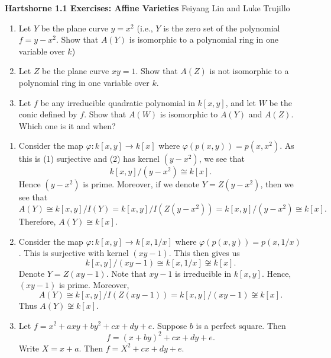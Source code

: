 \documentclass{/Users/SHER/Documents/Hartshorne-Exercises/hw_pset} %
\renewcommand{\phi}{\varphi}
\newcommand{\header}[2]{
    {\noindent
    {\Large \bf Hartshorne #1 Exercises: #2}
    \hfill 
    {\large Feiyang Lin and Luke Trujillo}
    \vspace{0.5cm}}
}
\begin{document}
\header{1.1}{Affine Varieties}
    
\begin{exercise}[1.1]
    \begin{enumerate}
        \item Let $Y$ be the plane curve $y = x^2$ (i.e., $Y$ is the zero set of 
        the polynomial $f = y - x^2$. Show that $A(Y)$ is isomorphic to a polynomial ring 
        in one variable over $k$)

        \item Let $Z$ be the plane curve $xy = 1$. Show that $A(Z)$ is not isomorphic to 
        a polynomial ring in one variable over $k$. 
        
        \item Let $f$ be any irreducible quadratic polynomial in $k[x, y]$, and let 
        $W$ be the conic defined by $f$. Show that $A(W)$ is isomorphic to $A(Y)$ and $A(Z)$.
        Which one is it and when? 
    \end{enumerate}
\end{exercise}

\begin{solution}
    \begin{enumerate}
        \item Consider the map $\phi: k[x, y] \to k[x]$ where $\phi(p(x, y)) = p(x, x^2)$. 
        As this is (1) surjective and (2) has kernel $(y - x^2)$, we see that 
        \[
            k[x, y]/(y - x^2) \cong k[x].
        \]
        Hence $(y - x^2)$ is prime. Moreover, if we denote 
        $Y = Z(y - x^2)$, then we see that
        \[
            A(Y) \cong k[x, y]/I(Y) = k[x, y]/I(Z(y - x^2)) = k[x, y]/(y - x^2)
            \cong k[x].
        \]
        Therefore, $A(Y) \cong k[x]$. 

        \item Consider the map 
        $\phi: k[x, y] \to k[x, 1/x]$ where $\phi(p(x, y)) = p(x, 1/x)$. This 
        is surjective with kernel $(xy - 1)$. This then gives us 
        \[
            k[x, y]/(xy - 1) \cong k[x, 1/x] \not\cong k[x].
        \]
        Denote $Y = Z(xy - 1)$. Note that $xy - 1$ is irreducible in $k[x, y]$. 
        Hence, $(xy - 1)$ is prime. Moreover, 
        \[
            A(Y) \cong k[x, y]/I(Z(xy - 1)) = k[x, y]/(xy - 1)\not\cong k[x].
        \]
        Thus $A(Y) \not\cong k[x]$. 

        \item Let $f = x^2 + axy + by^2 + cx + dy + e$. 
        Suppose $b$ is a perfect square. Then 
        \[
            f = (x + by)^2 + cx + dy + e.
        \]
        Write $X = x + a$. Then $f = X^2 + cx + dy +e$. 
    \end{enumerate}
\end{solution}
\end{document}
